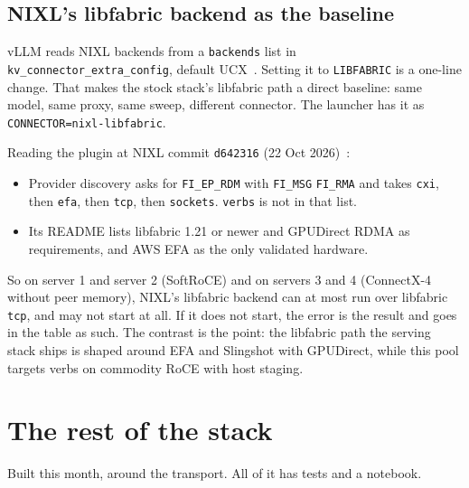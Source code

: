 \documentclass[11pt,letterpaper]{article}
\begin{document}
\subsection{NIXL's libfabric backend as the baseline}
vLLM reads NIXL backends from a \texttt{backends} list in \texttt{kv\_connector\_extra\_config}, default UCX~\cite{vllm_nixl}. Setting it to \texttt{LIBFABRIC} is a one-line change. That makes the stock stack's libfabric path a direct baseline: same model, same proxy, same sweep, different connector. The launcher has it as \texttt{CONNECTOR=nixl-libfabric}.

Reading the plugin at NIXL commit \texttt{d642316} (22 Oct 2026)~\cite{nixl_lf}:
\begin{itemize}
\item Provider discovery asks for \texttt{FI\_EP\_RDM} with \texttt{FI\_MSG}\,\textbar\,\texttt{FI\_RMA} and takes \texttt{cxi}, then \texttt{efa}, then \texttt{tcp}, then \texttt{sockets}. \texttt{verbs} is not in that list.
\item Its README lists libfabric 1.21 or newer and GPUDirect RDMA as requirements, and AWS EFA as the only validated hardware.
\end{itemize}
So on server 1 and server 2 (SoftRoCE) and on servers 3 and 4 (ConnectX-4 without peer memory), NIXL's libfabric backend can at most run over libfabric \texttt{tcp}, and may not start at all. If it does not start, the error is the result and goes in the table as such. The contrast is the point: the libfabric path the serving stack ships is shaped around EFA and Slingshot with GPUDirect, while this pool targets verbs on commodity RoCE with host staging.

\section{The rest of the stack}
\label{sec:stack}

Built this month, around the transport. All of it has tests and a notebook.
\end{document}
